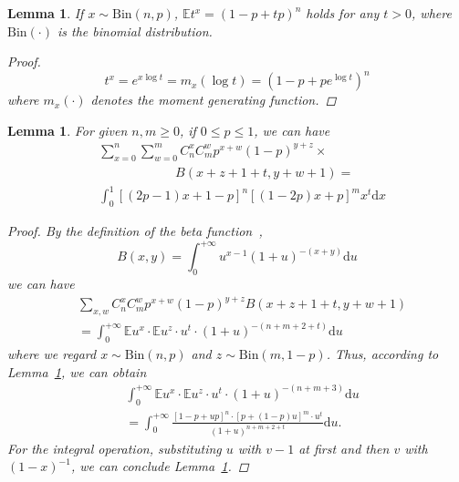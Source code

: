 \documentclass{article}
\newtheorem{lemma}[theorem]{Lemma}
\begin{document}

\begin{lemma}
\label{MoGene}
If $x\sim \mathrm{Bin}(n,p)$, $\mathbb{E}t^x= \left(1-p+tp\right)^{n}$ holds for any $t>0$, where $\mathrm{Bin}(\cdot)$ is the binomial distribution.
\begin{proof}
\begin{equation}
t^x = e^{x\log t}=m_x(\log t)= \left(1-p+pe^{\log t}\right)^{n}
\end{equation}
where $m_x(\cdot)$ denotes the moment generating function.
\end{proof}
\end{lemma}

\begin{lemma}
\label{SolveF}
For given $n,m\geq 0$, if $0\leq p\leq 1$, we can have
\begin{equation*}
\begin{split}
&{\sum}_{x=0}^{n}{\sum}_{w=0}^{m} C_{n}^{x}C_{m}^{w}p^{x+w}(1-p)^{y+z}\times\\
&\qquad\qquad\qquad B(x+z+1+t,y+w+1)=\\
&\int_{0}^{1}[(2p-1)x+1-p]^{n}[(1-2p)x+p]^{m}x^{t}\mathrm{d}x
\end{split}
\end{equation*}
\begin{proof}
By the definition of the beta function~\cite{olver2010nist},
\begin{equation}
B(x, y) = \int_{0}^{+\infty} u^{x-1}(1+u)^{-(x+y)}\mathrm{d}u
\end{equation}
we can have
\begin{align}
&\sum_{x,w} C_{n}^{x}C_{m}^{w}p^{x+w}(1-p)^{y+z}B(x+z+1+t,y+w+1)\nonumber\\
&= \int_{0}^{+\infty} \mathbb{E}u^{x}\cdot\mathbb{E}u^z \cdot u^t\cdot (1+u)^{-(n+m+2+t)}\mathrm{d}u
\end{align}
where we regard $x\sim \mathrm{Bin}(n,p)$ and $z\sim \mathrm{Bin}(m,1-p)$.
Thus, according to Lemma~\ref{MoGene}, we can obtain
\begin{equation}
\begin{split}
&\int_{0}^{+\infty} \mathbb{E}u^{x}\cdot\mathbb{E}u^z \cdot u^t\cdot (1+u)^{-(n+m+3)}\mathrm{d}u\\
&=\int_{0}^{+\infty} \frac{[1-p+up]^n\cdot [p+(1-p)u]^m\cdot u^t}{(1+u)^{n+m+2+t}}\mathrm{d}u.
\end{split}
\end{equation}
For the integral operation, substituting $u$ with $v-1$ at first and then $v$ with $(1-x)^{-1}$, we can conclude Lemma~\ref{SolveF}.
\end{proof}
\end{lemma}




\end{document}

